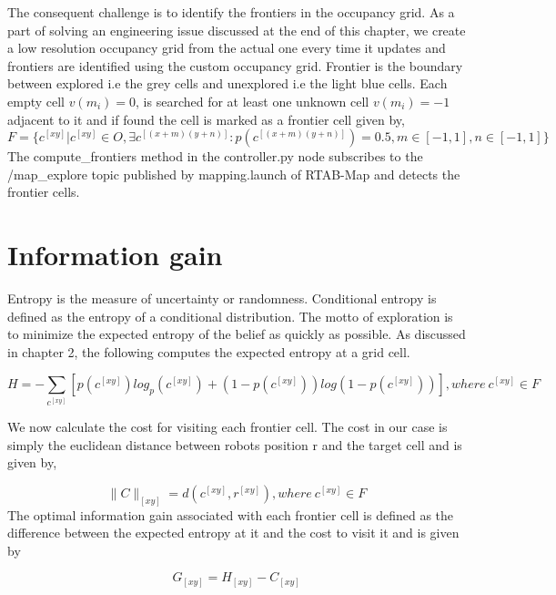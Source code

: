 \par The consequent challenge is to identify the frontiers in the occupancy grid. As a part of solving an engineering issue discussed at the end of this chapter, we create a low resolution occupancy grid from the actual one every time it updates and frontiers are identified using the custom occupancy grid. Frontier is the boundary between explored i.e the grey cells and unexplored i.e the light blue cells. Each empty cell $v(m_i)=0$, is searched for at least one unknown cell $v(m_i)=-1$ adjacent to it and if found the cell is marked as a frontier cell given by,
\begin{equation}
    F = \{c^{[xy]} | c^{[xy]} \in O, \exists c^{[(x+m)(y+n)]} : p(c^{[(x+m)(y+n)]})=0.5, m\in[-1,1], n\in[-1,1]\}
\end{equation}
The compute\_frontiers method in the controller.py node subscribes to the /map\_explore topic published by mapping.launch of RTAB-Map and detects the frontier cells.

\section{Information gain}
Entropy is the measure of uncertainty or randomness. Conditional entropy is defined as the entropy of a conditional distribution\cite{15}. The motto of exploration is to minimize the expected entropy of the belief as quickly as possible. As discussed in chapter 2, the following computes the expected entropy at a grid cell. 

\begin{equation}
    H = -\sum_{c^{[xy]}}[p(c^{[xy]})log_p(c^{[xy]}) + (1-p(c^{[xy]}))log(1-p(c^{[xy]}))], where~c^{[xy]} \in F
\end{equation}

We now calculate the cost for visiting each frontier cell. The cost in our case is simply the euclidean distance between robots position r and the target cell and is given by,

\begin{equation}
    \|C\|_{[xy]} = d(c^{[xy]},r^{[xy]}), where~c^{[xy]} \in F
\end{equation}
The optimal information gain associated with each frontier cell is defined as the difference between the expected entropy at it and the cost to visit it and is given by

\begin{equation}
    G_{[xy]} = H_{[xy]} - C_{[xy]} 
\end{equation}

